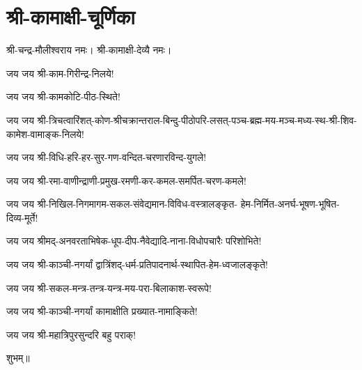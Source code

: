 
\closesub


\section{श्री-कामाक्षी-चूर्णिका}

श्री-चन्द्र-मौलीश्वराय नमः। श्री-कामाक्षी-देव्यै नमः।

जय जय श्री-काम-गिरीन्द्र-निलये!

जय जय श्री-कामकोटि-पीठ-स्थिते!

जय जय श्री-त्रिचत्वारिंशत्-कोण-श्रीचक्रान्तराल-बिन्दु-पीठोपरि-लसत्-पञ्च-ब्रह्म-मय-मञ्च-मध्य-स्थ-श्री-शिव-कामेश-वामाङ्क-निलये!

जय जय श्री-विधि-हरि-हर-सुर-गण-वन्दित-चरणारविन्द-युगले!

जय जय श्री-रमा-वाणीन्द्राणी-प्रमुख-रमणी-कर-कमल-समर्पित-चरण-कमले!

जय जय श्री-निखिल-निगमागम-सकल-संवेद्यमान-विविध-वस्त्रालङ्कृत-
हेम-निर्मित-अनर्घ-भूषण-भूषित-दिव्य-मूर्ते!

जय जय श्रीमद्-अनवरताभिषेक-धूप-दीप-नैवेद्यादि-नाना-विधोपचारैः परिशोभिते!

जय जय श्री-काञ्ची-नगर्यां द्वात्रिंशद्-धर्म-प्रतिपादनार्थ-स्थापित-हेम-ध्वजालङ्कृते!

जय जय श्री-सकल-मन्त्र-तन्त्र-यन्त्र-मय-परा-बिलाकाश-स्वरूपे!

जय जय श्री-काञ्ची-नगर्यां कामाक्षीति प्रख्यात-नामाङ्किते!

जय जय श्री-महात्रिपुरसुन्दरि बहु पराक्!


\centerline{शुभम्॥}

\closesub
\begingroup

\endgroup
\closesection
